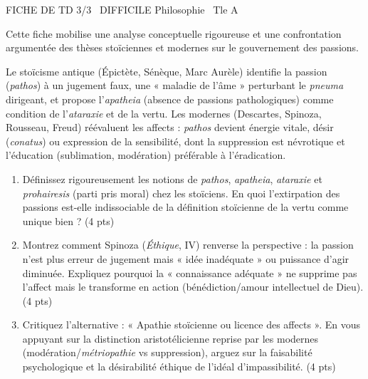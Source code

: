 \documentclass[11pt]{article}
\begin{document}
\begin{tcolorbox}[enhanced,colback=popink,colframe=popink,arc=10pt,boxrule=0pt,left=12pt,right=12pt,top=9pt,bottom=9pt]
{\color{white}\popxbold\small FICHE DE TD 3/3 \textbullet\ DIFFICILE \hfill Philosophie \textbullet\ Tle A\par}
\end{tcolorbox}
\vspace{4pt}
Cette fiche mobilise une analyse conceptuelle rigoureuse et une confrontation argumentée des thèses stoïciennes et modernes sur le gouvernement des passions.

\begin{exercice}
Le stoïcisme antique (Épictète, Sénèque, Marc Aurèle) identifie la passion (\textit{pathos}) à un jugement faux, une « maladie de l'âme » perturbant le \textit{pneuma} dirigeant, et propose l'\textit{apatheia} (absence de passions pathologiques) comme condition de l'\textit{ataraxie} et de la vertu. Les modernes (Descartes, Spinoza, Rousseau, Freud) réévaluent les affects : \textit{pathos} devient énergie vitale, désir (\textit{conatus}) ou expression de la sensibilité, dont la suppression est névrotique et l'éducation (sublimation, modération) préférable à l'éradication.
\begin{enumerate}
    \item Définissez rigoureusement les notions de \textit{pathos}, \textit{apatheia}, \textit{ataraxie} et \textit{prohairesis} (parti pris moral) chez les stoïciens. En quoi l'extirpation des passions est-elle indissociable de la définition stoïcienne de la vertu comme unique bien ? (4 pts)
    \item Montrez comment Spinoza (\textit{Éthique}, IV) renverse la perspective : la passion n'est plus erreur de jugement mais « idée inadéquate » ou puissance d'agir diminuée. Expliquez pourquoi la « connaissance adéquate » ne supprime pas l'affect mais le transforme en action (bénédiction/amour intellectuel de Dieu). (4 pts)
    \item Critiquez l'alternative : « Apathie stoïcienne ou licence des affects ». En vous appuyant sur la distinction aristotélicienne reprise par les modernes (modération/\textit{métriopathie} vs suppression), arguez sur la faisabilité psychologique et la désirabilité éthique de l'idéal d'impassibilité. (4 pts)
\end{enumerate}
\end{exercice}
\end{document}
